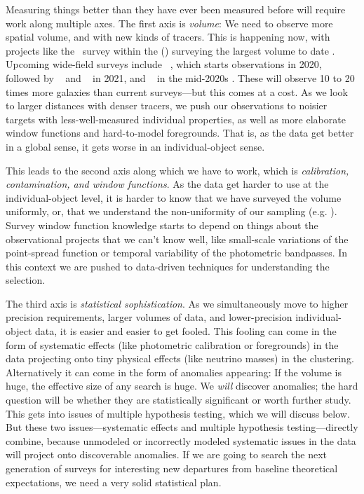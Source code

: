 \documentclass[12pt, fullpage, letterpaper]{article}
\begin{document}
Measuring things better than they have ever been measured before will require work along
multiple axes.
The first axis is \emph{volume}: We need to observe more spatial volume, and with new kinds
of tracers.
This is happening now, with projects like the \eBOSS\ survey within the  (\SDSSIV) surveying the largest volume to date
\citep{Dawson2015}.
Upcoming wide-field surveys include \DESI\ 
\citep{Aghamousa2016}, which starts observations in 2020, followed
by \NASA\ \project{Euclid} \citep{Amiaux2012} and
\LSST\ \citep{Ivezic2018} in 2021, and \NASA\  in the mid-2020s
\citep{Akeson2019}.
These will observe 10 to 20 times more galaxies than current surveys---but this comes at a cost. As we look to larger
distances with denser tracers, we push our
observations to noisier targets with less-well-measured individual
properties, as well as more elaborate window functions and hard-to-model foregrounds.
That is, as the data get better in a global sense, it gets worse in an individual-object sense.

This leads to the second axis along which we have to work, which
is \emph{calibration, contamination, and window functions}.
As the data get harder to use at the individual-object level, it is
harder to know that we have surveyed the volume uniformly, or,
that we understand the non-uniformity of our sampling (e.g. \citealt{Sato2013}).
Survey window function knowledge starts to depend on things about the
observational projects that we can't know well, like small-scale
variations of the point-spread function or temporal variability of the
photometric bandpasses.
In this context we are pushed to data-driven techniques for
understanding the selection.

The third axis is \emph{statistical sophistication}.
As we simultaneously move to higher precision requirements, larger
volumes of data, and lower-precision individual-object data, it is 
easier and easier to get fooled.
This fooling can come in the form of systematic effects (like
photometric calibration or foregrounds) in the data projecting onto
tiny physical effects (like neutrino masses) in the clustering.
Alternatively it can come in the form of anomalies appearing: If the volume is
huge, the effective size of any search is huge.
We \emph{will} discover anomalies; the hard question will be whether
they are statistically significant or worth further study.
This gets into issues of multiple hypothesis testing, which we will
discuss below.
But these two issues---systematic effects and multiple hypothesis
testing---directly combine, because unmodeled or incorrectly modeled
systematic issues in the data will project onto discoverable
anomalies.
If we are going to search the next generation of surveys for
interesting new departures from baseline theoretical expectations,
we need a very solid statistical plan.
\end{document}
